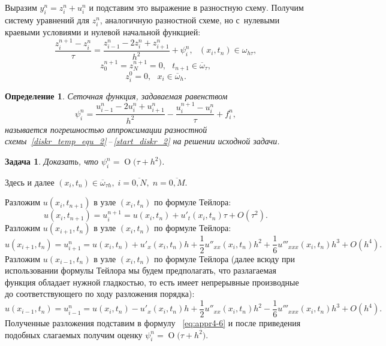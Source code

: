 \documentclass[11pt,a4paper,twoside,listtotoc,bibtotoc]{report}
\numberwithin{equation}{section}
\newtheorem*{problem}{Задача}
\newtheorem*{definition}{Определение}
\theoremstyle{definition}
\theoremstyle{plain}
\newcommand{\bigO}[1]{\ensuremath{\operatorname{O}\bigl(#1\bigr)}}
\begin{document}
Выразим $y_i^n = z_i^n + u_i^n$ и подставим
это выражение в разностную схему. Получим систему уравнений для $z_i^n$,
аналогичную разностной схеме, но с~нулевыми краевыми условиями и нулевой начальной
функцией:
%
\begin{equation}
    \label{z_eq}
    \dfrac{z_i^{n+1} - z_i^n}{\tau} = \dfrac{z_{i-1}^n - 2z_i^n +
    z_{i+1}^n}{h^2} + \psi_i^n,~~~(x_i, t_n) \in \omega_{h \tau},
\end{equation}
%
\begin{equation}
    \label{z_boards}
    z_0^{n+1} = z_N^{n+1} = 0,~~~t_{n+1}\in \overline{\omega}_\tau,
\end{equation}
%
\begin{equation}
    \label{z_start}
    z_i^0 = 0,~~~x_i\in \overline{\omega}_h.
\end{equation}
%
\begin{definition}
%
    Сеточная функция, задаваемая равенством
    \begin{equation}
        \label{eq:appr4-6}
        \psi_i^n = \dfrac{u_{i-1}^n - 2u_i^n + u_{i+1}^n}{h^2} -
        \dfrac{u_i^{n+1} - u_i^n}{\tau} + f_i^n,
    \end{equation}
    называется
    погрешностью аппроксимации разностной
    схемы~\eqref{diskr_temp_equ_2}\,--\,\eqref{start_diskr_2}
    на решении исходной задачи.
%
\end{definition}
%
\begin{problem}
%
    Доказать, что $\psi_i^n = \bigO{\tau + h^2}$.
%
\end{problem}
%
\begin{solution}
%
    Здесь и далее $(x_i, t_n) \in \overline{\omega}_{\tau h}, \;i=\overline{0,N},\;
    n=\overline{0,M}$.

    Разложим $u(x_i,t_{n + 1})$ в узле $(x_i,t_n)$ по формуле Тейлора:
    $$
        u(x_i,t_{n + 1}) = u_i^{n + 1} =  u(x_i,t_{n}) + u'_t(x_i,t_{n})\tau +
        O(\tau^2).
    $$
    Разложим $u(x_{i + 1},t_{n})$ в узле $(x_i,t_n)$ по формуле Тейлора:
    $$
        u(x_{i + 1},t_{n}) = u_{i + 1}^{n} =  u(x_i,t_{n}) + u'_x(x_i,t_{n})h +
        \dfrac12u''_{xx}(x_i,t_{n})h^2 + \dfrac16 u'''_{xxx}(x_i,t_{n})h^3  + O(h^4).
    $$
    Разложим $u(x_{i - 1},t_{n})$ в узле $(x_i,t_n)$ по формуле Тейлора (далее всюду
    при использовании формулы Тейлора мы будем предполагать, что разлагаемая
    функция обладает нужной гладкостью, то есть имеет непрерывные производные
    до соответствующего по ходу разложения порядка):
    $$
        u(x_{i - 1},t_{n}) = u_{i - 1}^{n} =  u(x_i,t_{n}) - u'_x(x_i,t_{n})h +
        \dfrac12u''_{xx}(x_i,t_{n})h^2 -\dfrac16 u'''_{xxx}(x_i,t_{n})h^3  + O(h^4).
    $$
    Полученные разложения подставим в формулу ~\eqref{eq:appr4-6} и
    после приведения подобных слагаемых получим оценку $\psi_i^n =
    \bigO{\tau + h^2}$.
%
\end{solution}
%
\end{document}
